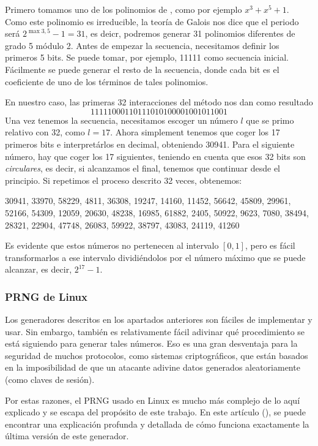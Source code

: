 \begin{example}
Primero tomamos uno de los polinomios de \cite{zierler1969}, como por ejemplo $x^3+x^5+1$. Como este polinomio es irreducible, la teoría de Galois nos dice que el periodo será $2^{\max3,5}-1=31$, es deicr, podremos generar 31 polinomios diferentes de grado 5 módulo 2. Antes de empezar la secuencia, necesitamos definir los primeros 5 bits. Se puede tomar, por ejemplo, 11111 como secuencia inicial. Fácilmente se puede generar el resto de la secuencia, donde cada bit es el coeficiente de uno de los términos de tales polinomios. 

En nuestro caso, las primeras 32 interacciones del método nos dan como resultado
\[
11111000110111010100001001011001
\]
Una vez tenemos la secuencia, necesitamos escoger un número $l$ que se primo relativo con 32, como $l=17$. Ahora simplement tenemos que coger los 17 primeros bits e interpretárlos en decimal, obteniendo 30941. Para el siguiente número, hay que coger los 17 siguientes, teniendo en cuenta que esos 32 bits son \textit{circulares}, es decir, si alcanzamos el final, tenemos que continuar desde el principio. Si repetimos el proceso descrito 32 veces, obtenemos:
\begin{center}
30941, 33970, 58229, 4811, 36308, 19247, 14160, 11452, 56642, 45809, 29961, 52166, 54309, 12059, 20630, 48238, 16985, 61882, 2405, 50922, 9623, 7080, 38494, 28321, 22904, 47748, 26083, 59922, 38797, 43083, 24119, 41260
\end{center}
Es evidente que estos números no pertenecen al intervalo $[0,1]$, pero es fácil transformarlos a ese intervalo dividiéndolos por el número máximo que se puede alcanzar, es decir, $2^{17}-1$.
\end{example}

\subsubsection{PRNG de Linux}

Los generadores descritos en los apartados anteriores son fáciles de implementar y usar. Sin embargo, también es relativamente fácil adivinar qué procedimiento se está siguiendo para generar tales números. Eso es una gran desventaja para la seguridad de muchos protocolos, como sistemas criptográficos, que están basados en la imposibilidad de que un atacante adivine datos generados aleatoriamente (como claves de sesión).

Por estas razones, el PRNG usado en Linux es mucho más complejo de lo aquí explicado y se escapa del propósito de este trabajo. En este artículo (\cite{lacharme2012}), se puede encontrar una explicación profunda y detallada de cómo funciona exactamente la última versión de este generador.

